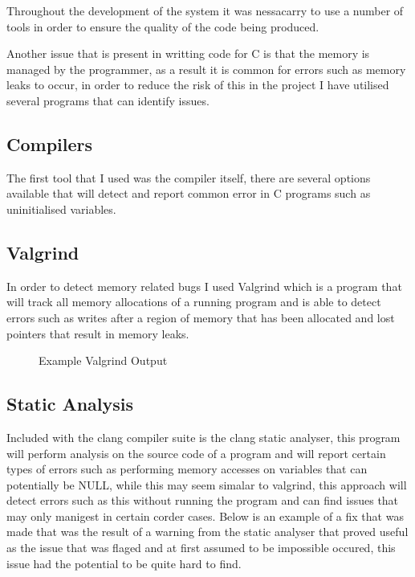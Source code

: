 Throughout the development of the system it was nessacarry to use a number of tools in order to ensure the
quality of the code being produced.

Another issue that is present in writting code for C is that the memory is managed by the programmer, as a
result it is common for errors such as memory leaks to occur, in order to reduce the risk of this in the project
I have utilised several programs that can identify issues.

\subsection{Compilers}

The first tool that I used was the compiler itself, there are several options available that will detect and report
common error in C programs such as uninitialised variables.

\subsection{Valgrind}
In order to detect memory related bugs I used Valgrind which is a program that will track all memory allocations
of a running program and is able to detect errors such as writes after a region of memory that has been allocated
and lost pointers that result in memory leaks.

\begin{figure}

\label{fig:valgrind_listing}
\caption{Example Valgrind Output}
\end{figure}

\subsection{Static Analysis}
Included with the clang compiler suite is the clang static analyser, this program will perform analysis on the
source code of a program and will report certain types of errors such as performing memory accesses on variables
that can potentially be NULL, while this may seem simalar to valgrind, this approach will detect errors such
as this without running the program and can find issues that may only manigest in certain corder cases. Below
is an example of a fix that was made that was the result of a warning from the static analyser that proved
useful as the issue that was flaged and at first assumed to be impossible occured, this issue had the potential
to be quite hard to find.

